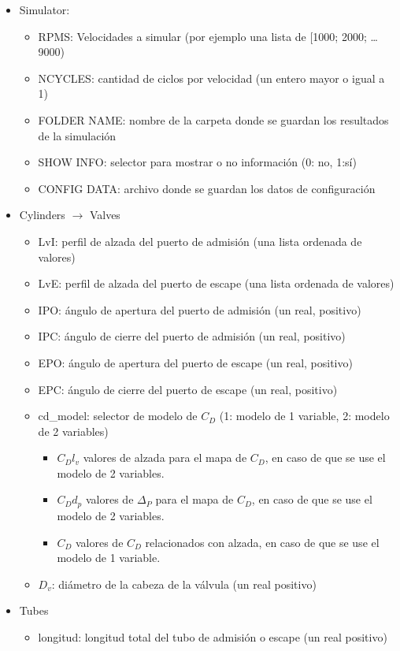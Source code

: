 \begin{itemize}
  \item Simulator:
        \begin{itemize}
          \item RPMS: Velocidades a simular (por ejemplo una lista de [1000; 2000; \ldots 9000)
          \item NCYCLES: cantidad de ciclos por velocidad (un entero mayor o igual a 1)
          \item FOLDER NAME: nombre de la carpeta donde se guardan los
resultados de la simulación
          \item SHOW INFO: selector para mostrar o no información (0: no, 1:sí)
          \item CONFIG DATA: archivo donde se guardan los datos de configuración
        \end{itemize}
  \item Cylinders $\longrightarrow$ Valves
        \begin{itemize}
          \item LvI: perfil de alzada del puerto de admisión (una lista ordenada de valores)
          \item LvE: perfil de alzada del puerto de escape (una lista ordenada de valores)
          \item IPO: ángulo de apertura del puerto de admisión (un real, positivo)
          \item IPC: ángulo de cierre del puerto de admisión (un real, positivo)
          \item EPO: ángulo de apertura del puerto de escape (un real, positivo)
          \item EPC: ángulo de cierre del puerto de escape (un real, positivo)
          \item cd\_model: selector de modelo de $C_{D}$ (1: modelo de 1 variable, 2: modelo de 2 variables)
                \begin{itemize}
                  \item $C_{D}l_{v}$ valores de alzada para el mapa de $C_{D}$,
en caso de que se use el modelo de 2 variables.
                  \item $C_{D}d_{p}$ valores de $\Delta_{P}$ para el mapa de
$C_{D}$, en caso de que se use el modelo de 2 variables.
                  \item $C_{D}$ valores de $C_{D}$ relacionados con alzada, en
caso de que se use el modelo de 1 variable.
                \end{itemize}
          \item $D_{v}$: diámetro de la cabeza de la válvula (un real positivo)
        \end{itemize}
  \item Tubes
        \begin{itemize}
          \item longitud: longitud total del tubo de admisión o escape (un real positivo)
        \end{itemize}
\end{itemize}

